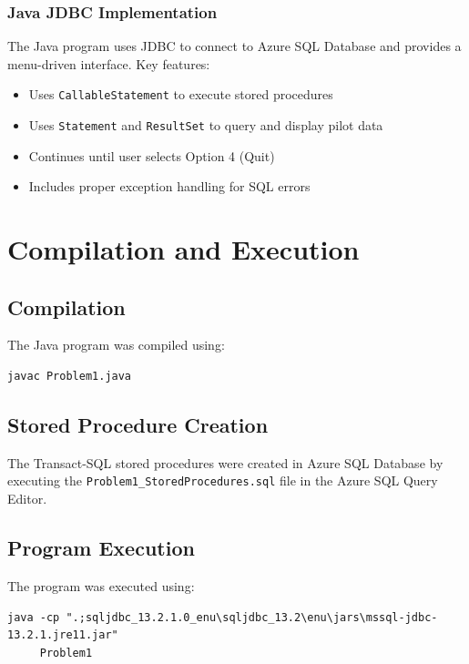 \documentclass[12pt]{article}
\begin{document}
\subsubsection{Java JDBC Implementation}

The Java program uses JDBC to connect to Azure SQL Database and provides a menu-driven interface. Key features:
\begin{itemize}
    \item Uses \texttt{CallableStatement} to execute stored procedures
    \item Uses \texttt{Statement} and \texttt{ResultSet} to query and display pilot data
    \item Continues until user selects Option 4 (Quit)
    \item Includes proper exception handling for SQL errors
\end{itemize}

\newpage
\section{Compilation and Execution}

\subsection{Compilation}

The Java program was compiled using:

{\footnotesize
\begin{verbatim}
javac Problem1.java
\end{verbatim}
}

\subsection{Stored Procedure Creation}

The Transact-SQL stored procedures were created in Azure SQL Database by executing the \texttt{Problem1\_StoredProcedures.sql} file in the Azure SQL Query Editor.

\subsection{Program Execution}

The program was executed using:

{\footnotesize
\begin{verbatim}
java -cp ".;sqljdbc_13.2.1.0_enu\sqljdbc_13.2\enu\jars\mssql-jdbc-13.2.1.jre11.jar" 
     Problem1
\end{verbatim}
}
\end{document}
